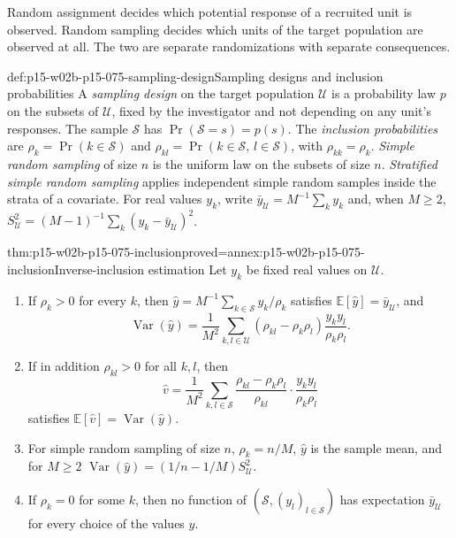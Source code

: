 Random assignment decides which potential response of a recruited unit is
observed. Random sampling decides which units of the target population are
observed at all. The two are separate randomizations with separate
consequences.

\begin{hbdefinition}{def:p15-w02b-p15-075-sampling-design}{Sampling designs and inclusion probabilities}
A \emph{sampling design} on the target population \(\mathcal U\) is a
probability law \(p\) on the subsets of \(\mathcal U\), fixed by the
investigator and not depending on any unit's responses. The sample
\(\mathcal S\) has \(\Pr(\mathcal S=s)=p(s)\). The \emph{inclusion
probabilities} are \(\rho_k=\Pr(k\in\mathcal S)\) and
\(\rho_{kl}=\Pr(k\in\mathcal S,\,l\in\mathcal S)\), with
\(\rho_{kk}=\rho_k\). \emph{Simple random sampling} of size \(n\) is the
uniform law on the subsets of size \(n\). \emph{Stratified simple random
sampling} applies independent simple random samples inside the strata of a
covariate. For real values \(y_k\), write
\(\bar y_{\mathcal U}=M^{-1}\sum_ky_k\) and, when \(M\geq2\),
\(S_{\mathcal U}^2=(M-1)^{-1}\sum_k(y_k-\bar y_{\mathcal U})^2\).
\end{hbdefinition}

\begin{hbtheorem}{thm:p15-w02b-p15-075-inclusion}{proved=annex:p15-w02b-p15-075-inclusion}{Inverse-inclusion estimation}
Let \(y_k\) be fixed real values on \(\mathcal U\).
\begin{enumerate}
\item If \(\rho_k>0\) for every \(k\), then
\(\widehat y=M^{-1}\sum_{k\in\mathcal S}y_k/\rho_k\) satisfies
\(\mathbb E[\widehat y]=\bar y_{\mathcal U}\), and
\[
 \operatorname{Var}(\widehat y)
 =\frac1{M^2}\sum_{k,l\in\mathcal U}
  (\rho_{kl}-\rho_k\rho_l)\frac{y_ky_l}{\rho_k\rho_l}.
\]
\item If in addition \(\rho_{kl}>0\) for all \(k,l\), then
\[
 \widehat v=\frac1{M^2}\sum_{k,l\in\mathcal S}
  \frac{\rho_{kl}-\rho_k\rho_l}{\rho_{kl}}\cdot\frac{y_ky_l}{\rho_k\rho_l}
\]
satisfies \(\mathbb E[\widehat v]=\operatorname{Var}(\widehat y)\).
\item For simple random sampling of size \(n\), \(\rho_k=n/M\),
\(\widehat y\) is the sample mean, and for \(M\geq2\)
\(\operatorname{Var}(\widehat y)=(1/n-1/M)S_{\mathcal U}^2\).
\item If \(\rho_k=0\) for some \(k\), then no function of
\((\mathcal S,(y_l)_{l\in\mathcal S})\) has expectation
\(\bar y_{\mathcal U}\) for every choice of the values \(y\).
\end{enumerate}
\end{hbtheorem}

